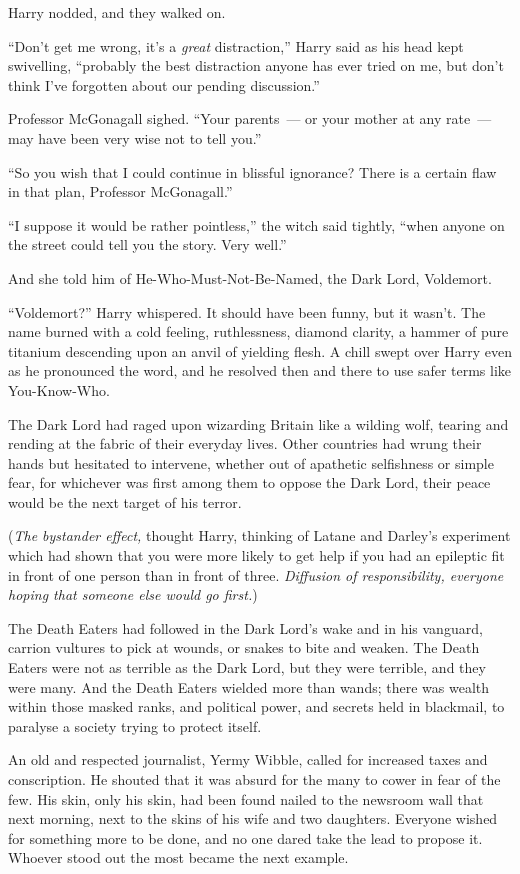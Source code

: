 Harry nodded, and they walked on.

``Don't get me wrong, it's a \emph{great} distraction,'' Harry said as his head kept swivelling, ``probably the best distraction anyone has ever tried on me, but don't think I've forgotten about our pending discussion.''

Professor McGonagall sighed. ``Your parents~--- or your mother at any rate~--- may have been very wise not to tell you.''

``So you wish that I could continue in blissful ignorance? There is a certain flaw in that plan, Professor McGonagall.''

``I suppose it would be rather pointless,'' the witch said tightly, ``when anyone on the street could tell you the story. Very well.''

And she told him of He-Who-Must-Not-Be-Named, the Dark Lord, Voldemort.

``Voldemort?'' Harry whispered. It should have been funny, but it wasn't. The name burned with a cold feeling, ruthlessness, diamond clarity, a hammer of pure titanium descending upon an anvil of yielding flesh. A chill swept over Harry even as he pronounced the word, and he resolved then and there to use safer terms like You-Know-Who.

The Dark Lord had raged upon wizarding Britain like a wilding wolf, tearing and rending at the fabric of their everyday lives. Other countries had wrung their hands but hesitated to intervene, whether out of apathetic selfishness or simple fear, for whichever was first among them to oppose the Dark Lord, their peace would be the next target of his terror.

(\emph{The bystander effect,} thought Harry, thinking of Latane and Darley's experiment which had shown that you were more likely to get help if you had an epileptic fit in front of one person than in front of three. \emph{Diffusion of responsibility, everyone hoping that someone else would go first.})

The Death Eaters had followed in the Dark Lord's wake and in his vanguard, carrion vultures to pick at wounds, or snakes to bite and weaken. The Death Eaters were not as terrible as the Dark Lord, but they were terrible, and they were many. And the Death Eaters wielded more than wands; there was wealth within those masked ranks, and political power, and secrets held in blackmail, to paralyse a society trying to protect itself.

An old and respected journalist, Yermy Wibble, called for increased taxes and conscription. He shouted that it was absurd for the many to cower in fear of the few. His skin, only his skin, had been found nailed to the newsroom wall that next morning, next to the skins of his wife and two daughters. Everyone wished for something more to be done, and no one dared take the lead to propose it. Whoever stood out the most became the next example.

